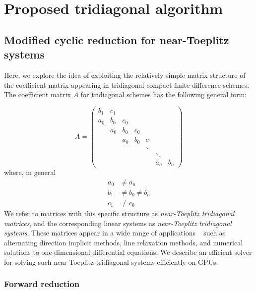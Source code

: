 \chapter{Proposed tridiagonal algorithm}

\section{Modified cyclic reduction for near-Toeplitz systems}

Here, we explore the idea of
exploiting the relatively simple matrix structure
of the coefficient matrix appearing in
tridiagonal compact finite difference schemes.
The coefficient matrix $A$ for tridiagonal schemes
has the following general form:

\begin{equation} \label{eqn:toeplitz-matrix}
A = 
\begin{pmatrix}
     b_1 & c_1  \\
     a_0 & b_0  &  c_0  \\
         & a_0  &  b_0 &  c_0  \\
         &      &  a_0 &  b_0 &  c    \\
         &      &      &      &  \ddots \\
         &      &      &      &     &  \ddots  \\
         &      &      &      &     &  a_n  &  b_n
\end{pmatrix}
\end{equation}
%
where, in general
\begin{align*}
    a_0 &\neq a_n  \\
    b_1 &\neq b_0 \neq b_n \\
    c_1 &\neq c_0 
\end{align*}
%
We refer to matrices with this specific structure as
\emph{near-Toeplitz tridiagonal matrices},
and the corresponding linear systems as
\emph{near-Toeplitz tridiagonal systems}.
These matrices appear in a wide range of applications
~\cite{sun1995application}
such as alternating direction implicit methods,
line relaxation methods,
and numerical solutions to one-dimensional differential equations.
We describe an efficient solver for solving such
near-Toeplitz tridiagonal systems efficiently on GPUs.
\subsection{Forward reduction}

